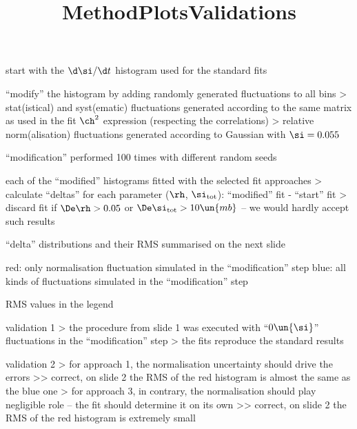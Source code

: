 


\newpage %

\def\author{J.~Kašpar}
\def\caption{Uncertainty propagation}
\def\date{22 Nov 2018}

\newpage %
\title{Method}

\> start with the $\d\si/\d t$ histogram used for the standard fits

\> ``modify'' the histogram by adding randomly generated fluctuations to all bins
\>> stat(istical) and syst(ematic) fluctuations generated according to the same matrix as used in the fit $\ch^2$ expression (respecting the correlations)
\>> relative norm(alisation) fluctuations generated according to Gaussian with $\si = 0.055$

\> ``modification'' performed 100 times with different random seeds

\> each of the ``modified'' histograms fitted with the selected fit approaches
\>> calculate ``deltas'' for each parameter ($\rh$, $\si_{\rm tot}$): ``modified'' fit - ``start'' fit
\>> discard fit if $\De\rh > 0.05$ or $\De\si_{\rm tot} > 10\un{mb}$ -- we would hardly accept such results

\> ``delta'' distributions and their RMS summarised on the next slide



\newpage %
\title{Plots}

\> red: only normalisation fluctuation simulated in the ``modification'' step
\> blue: all kinds of fluctuations simulated in the ``modification'' step

\> RMS values in the legend

\centerline{}



\newpage %
\title{Validations}

\> validation 1
\>> the procedure from slide 1 was executed with ``$0\un{\si}$'' fluctuations in the ``modification'' step
\>> the fits reproduce the standard results

\> validation 2
\>> for approach 1, the normalisation uncertainty should drive the errors
\>>> correct, on slide 2 the RMS of the red histogram is almost the same as the blue one
\>> for approach 3, in contrary, the normalisation should play negligible role -- the fit should determine it on its own
\>>> correct, on slide 2 the RMS of the red histogram is extremely small

